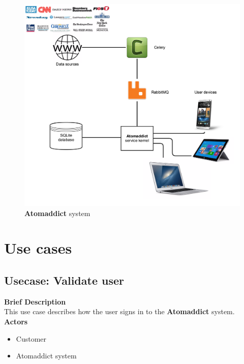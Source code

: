 \documentclass[12pt]{article}
\begin{document}
\begin{figure}[H]
    \centering
    \includegraphics[width=\textwidth]{images/systemDiagram.png}
    \caption{\textbf{Atomaddict} system}
    \label{fig:system}
\end{figure}


\section{Use cases}
\subsection{Usecase: Validate user}
\textbf{Brief Description}\\
This use case describes how the user signs in to the \textbf{Atomaddict} system.\\


\textbf{Actors}\\

\begin{itemize}

    \item Customer

    \item Atomaddict system

\end{itemize}
\end{document}
